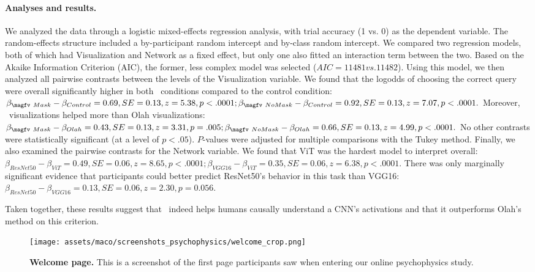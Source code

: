 \paragraph{Analyses and results.} We analyzed the data through a logistic mixed-effects regression analysis, with trial accuracy (1 vs. 0) as the dependent variable. The random-effects structure included a by-participant random intercept and by-class random intercept. We compared two regression models, both of which had Visualization and Network as a fixed effect, but only one also fitted an interaction term between the two. Based on the Akaike Information Criterion (AIC), the former, less complex model was selected ($AIC=11481 vs. 11482$). Using this model, we then analyzed all pairwise contrasts between the levels of the Visualization variable. We found that the logodds of choosing the correct query were overall significantly higher in both \magfv~conditions compared to the control condition: $\beta_{\magfv~Mask}-\beta_{Control} = 0.69, SE=0.13, z=5.38, p<.0001;\beta_{\magfv~NoMask}-\beta_{Control} = 0.92, SE=0.13, z=7.07, p<.0001.$ Moreover, \magfv~visualizations helped more than Olah visualizations: $\beta_{\magfv~Mask}-\beta_{Olah} = 0.43, SE=0.13, z=3.31, p=.005;\beta_{\magfv~NoMask}-\beta_{Olah} = 0.66, SE=0.13, z=4.99, p<.0001.$ No other contrasts were statistically significant (at a level of $p < .05$). $P$-values were adjusted for multiple comparisons with the Tukey method. Finally, we also examined the pairwise contrasts for the Network variable. We found that ViT was the hardest model to interpret overall: $\beta_{ResNet50}-\beta_{ViT} = 0.49, SE=0.06, z=8.65, p<.0001;\beta_{VGG16}-\beta_{ViT} = 0.35, SE=0.06, z=6.38, p<.0001.$ There was only marginally significant evidence that participants could better predict ResNet50's behavior in this task than VGG16: $\beta_{ResNet50}-\beta_{VGG16} = 0.13, SE=0.06, z=2.30, p=0.056.$

Taken together, these results suggest that \magfv~indeed helps humans causally understand a CNN's activations and that it outperforms Olah's method \cite{olah2017feature} on this criterion.

\clearpage

\begin{figure}[ht]
    \centering
    \texttt{[image: assets/maco/screenshots\_psychophysics/welcome\_crop.png]}
    \caption{\textbf{Welcome page.} This is a screenshot of the first page participants saw when entering our online psychophysics study.}
    \label{fig:psychophysics-welcome}
\end{figure}

